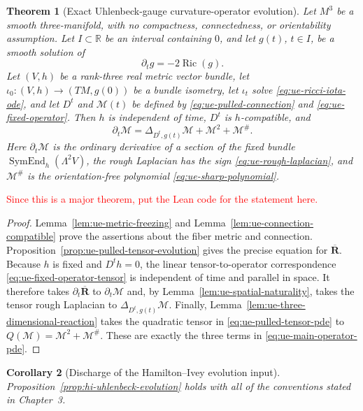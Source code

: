 \documentclass[10pt]{coll-l}
\newtheorem{theorem}{Theorem}[chapter]
\newtheorem{corollary}[theorem]{Corollary}
\theoremstyle{definition}
\theoremstyle{remark}
\numberwithin{section}{chapter}
\numberwithin{equation}{chapter}
\newcommand{\Ric}{\operatorname{Ric}}
\begin{document}
\begin{theorem}[Exact Uhlenbeck-gauge curvature-operator evolution]
\label{thm:ue-operator-evolution}
Let $M^3$ be a smooth three-manifold, with no compactness, connectedness,
or orientability assumption.  Let $I\subset\mathbb R$ be an interval
containing $0$, and let $g(t)$, $t\in I$, be a smooth solution of
\[
                         \partial_tg=-2\Ric(g).
\]
Let $(V,h)$ be a rank-three real metric vector bundle, let
$\iota_0:(V,h)\to(TM,g(0))$ be a bundle isometry, let $\iota_t$ solve
\eqref{eq:ue-ricci-iota-ode}, and let $D^t$ and $\mathcal M(t)$ be defined
by \eqref{eq:ue-pulled-connection} and
\eqref{eq:ue-fixed-operator}.  Then $h$ is independent of time, $D^t$ is
$h$-compatible, and
\begin{equation}
 \boxed{
 \partial_t\mathcal M
     =\Delta_{D^t,g(t)}\mathcal M
       +\mathcal M^2+\mathcal M^\# .}
                                                               \label{eq:ue-main-operator-pde}
\end{equation}
Here $\partial_t\mathcal M$ is the ordinary derivative of a section of the
fixed bundle $\operatorname{SymEnd}_h(\Lambda^2V)$, the rough Laplacian has
the sign \eqref{eq:ue-rough-laplacian}, and $\mathcal M^\#$ is the
orientation-free polynomial \eqref{eq:ue-sharp-polynomial}.
\end{theorem}

\textcolor{red}{Since this is a major theorem, put the Lean code for the statement here.}

\begin{proof}
Lemma~\ref{lem:ue-metric-freezing} and
Lemma~\ref{lem:ue-connection-compatible} prove the assertions about the
fiber metric and connection.  Proposition~\ref{prop:ue-pulled-tensor-evolution}
gives the precise equation for $\overline{\mathbf R}$.  Because $h$ is fixed
and $D^th=0$, the linear tensor-to-operator correspondence
\eqref{eq:ue-fixed-operator-tensor} is independent of time and parallel in
space.  It therefore takes $\partial_t\overline{\mathbf R}$ to
$\partial_t\mathcal M$ and, by
Lemma~\ref{lem:ue-spatial-naturality}, takes the tensor rough Laplacian to
$\Delta_{D^t,g(t)}\mathcal M$.  Finally,
Lemma~\ref{lem:ue-three-dimensional-reaction} takes the quadratic tensor
in \eqref{eq:ue-pulled-tensor-pde} to
$Q(\mathcal M)=\mathcal M^2+\mathcal M^\#$.  These are exactly the three
terms in \eqref{eq:ue-main-operator-pde}.
\end{proof}

\begin{corollary}[Discharge of the Hamilton--Ivey evolution input]
\label{cor:ue-discharge-hamilton-ivey}
Proposition~\ref{prop:hi-uhlenbeck-evolution} holds with all of the
conventions stated in Chapter~3.
\end{corollary}
\end{document}
